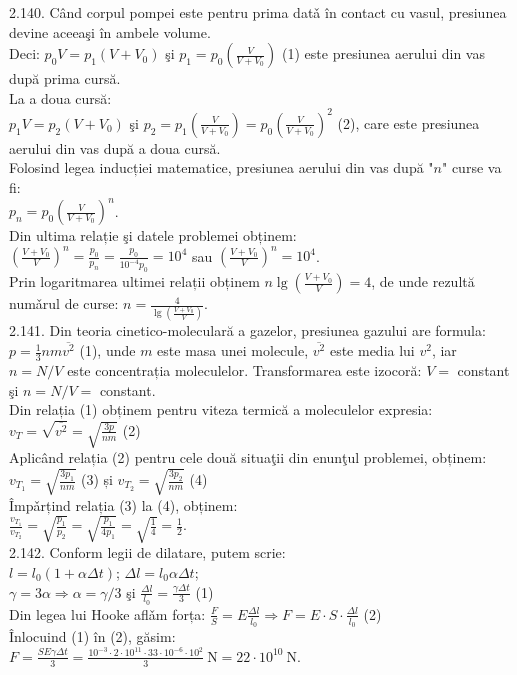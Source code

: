 2.140. Când corpul pompei este pentru prima datǎ în contact cu vasul, presiunea devine aceeaşi în ambele volume.\\ Deci: $p_{0} V=p_{1}\left(V+V_{0}\right)$ şi $p_{1}=p_{0}\left(\frac{V}{V+V_{0}}\right)$ (1) este presiunea aerului din vas după prima cursă.\\ La a doua cursă:\\ $p_{1} V=p_{2}\left(V+V_{0}\right)$ şi $p_{2}=p_{1}\left(\frac{V}{V+V_{0}}\right)=p_{0}\left(\frac{V}{V+V_{0}}\right)^{2}$ (2), care este presiunea aerului din vas după a doua cursă.\\ Folosind legea inducției matematice, presiunea aerului din vas după "$n$" curse va fi:\\ $p_{n}=p_{0}\left(\frac{V}{V+V_{0}}\right)^{n}$.\\ Din ultima relație şi datele problemei obținem:\\ $\left(\frac{V+V_{0}}{V}\right)^{n}=\frac{p_{0}}{p_{n}}=\frac{p_{0}}{10^{-4} p_{0}}=10^{4}$ sau $\left(\frac{V+V_{0}}{V}\right)^{n}=10^{4}$.\\ Prin logaritmarea ultimei relații obținem $n \lg \left(\frac{V+V_{0}}{V}\right)=4$, de unde rezultă numǎrul de curse: $n=\frac{4}{\lg \left(\frac{V+V_{0}}{V}\right)}$.\\

2.141. Din teoria cinetico-moleculară a gazelor, presiunea gazului are formula: $p=\frac{1}{3} n m \overline{v^{2}}$ (1), unde $m$ este masa unei molecule, $\overline{v^{2}}$ este media lui $v^{2}$, iar $n=N / V$ este concentrația moleculelor. Transformarea este izocoră: $V=$ constant şi $n=N / V=$ constant.\\ Din relația (1) obținem pentru viteza termică a moleculelor expresia:\\ $v_{T}=\sqrt{\overline{v^{2}}}=\sqrt{\frac{3 p}{n m}}$ (2)\\ Aplicând relația (2) pentru cele două situaţii din enunţul problemei, obținem: $v_{T_{1}}=\sqrt{\frac{3 p_{1}}{n m}}$ (3) și $v_{T_{2}}=\sqrt{\frac{3 p_{2}}{n m}}$ (4)\\ Împǎrțind relația (3) la (4), obținem:\\ $\frac{v_{T_{1}}}{v_{T_{2}}}=\sqrt{\frac{p_{1}}{p_{2}}}=\sqrt{\frac{p_{1}}{4 p_{1}}}=\sqrt{\frac{1}{4}}=\frac{1}{2}$.\\

2.142. Conform legii de dilatare, putem scrie:\\ $l=l_{0}(1+\alpha \Delta t)$; $\Delta l=l_{0} \alpha \Delta t$;\\ $\gamma=3 \alpha \Rightarrow \alpha=\gamma / 3$ şi $\frac{\Delta l}{l_{0}}=\frac{\gamma \Delta t}{3}$ (1)\\ Din legea lui Hooke aflǎm forța: $\frac{F}{S}=E \frac{\Delta l}{l_{0}} \Rightarrow F=E \cdot S \cdot \frac{\Delta l}{l_{0}}$ (2)\\ Înlocuind (1) în (2), găsim:\\ $F=\frac{S E \gamma \Delta t}{3}=\frac{10^{-3} \cdot 2 \cdot 10^{11} \cdot 33 \cdot 10^{-6} \cdot 10^{2}}{3} \mathrm{~N}=22 \cdot 10^{10} \mathrm{~N}$.\\

